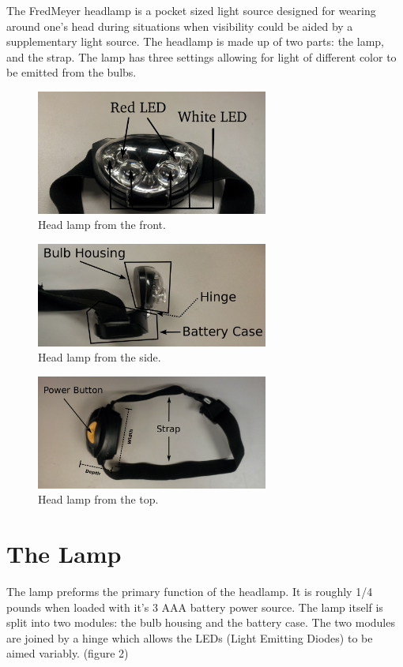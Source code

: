 \documentclass[12pt]{article}
\begin{document}
The FredMeyer headlamp is a pocket sized light source designed for wearing around one's head during
situations when visibility could be aided by a supplementary light source. The headlamp is made up
of two parts: the lamp, and the strap. The lamp has three settings allowing for light of different
color to be emitted from the bulbs.


\begin{figure}[h!]
\centering
\caption{Head lamp from the front.}
\includegraphics[width=3in]{headlamp}
\end{figure}

\begin{figure}[h!]
\centering
\caption{Head lamp from the side.}
\includegraphics[width=3in]{headlamp_side}
\end{figure}

\begin{figure}[h!]
\centering
\caption{Head lamp from the top.}
\includegraphics[width=3in]{headlamp_top}
\end{figure}

\section{The Lamp}
The lamp preforms the primary function of the headlamp. It is roughly 1/4 pounds when loaded with
it's 3 AAA battery power source. The lamp itself is split into two modules: the bulb housing and the
battery case. The two modules are joined by a hinge which allows the LEDs (Light Emitting
Diodes) to be aimed variably. (figure 2)
\end{document}

